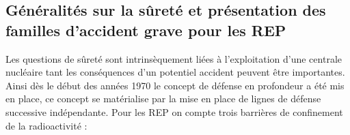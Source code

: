 %
\subsection{Généralités sur la sûreté et présentation des familles d'accident grave pour les REP}

Les questions de sûreté sont intrinsèquement liées à l'exploitation d'une centrale nucléaire tant les conséquences d'un potentiel accident peuvent être importantes. Ainsi dès le début des années 1970 le concept de défense en profondeur a été mis en place, ce concept se matérialise par la mise en place de lignes de défense successive indépendante. Pour les REP on compte trois barrières de confinement de la radioactivité :

